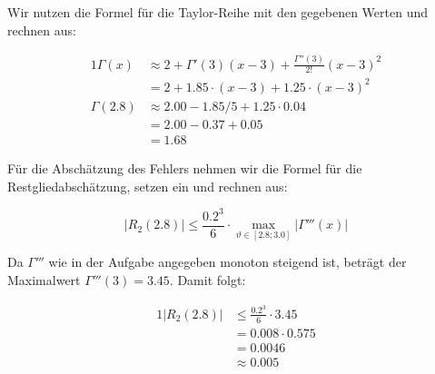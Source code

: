 \item Wir nutzen die Formel für die Taylor-Reihe mit den gegebenen Werten und rechnen aus:

\begin{alignat*}{1}
	\Gamma(x)     & \approx 2 + \Gamma'(3)(x-3) + \frac{\Gamma''(3)}{2!}(x-3)^2 \\
	              & = 2 + 1.85 \cdot (x-3) + 1.25 \cdot (x-3)^2 \\
	\Gamma(2.8)   & \approx 2.00 - 1.85 / 5 + 1.25\cdot {0.04} \\
	              & = 2.00 - 0.37 + 0.05 \\
	              & = 1.68
\end{alignat*}

Für die Abschätzung des Fehlers nehmen wir die Formel für die Restgliedabschätzung, setzen ein und rechnen aus:

$$
	|R_2(2.8)| \le \frac{0.2^3}{6}\cdot\max\limits_{\vartheta \in [2.8;3.0]} |\Gamma'''(x)|
$$

Da $\Gamma'''$ wie in der Aufgabe angegeben monoton steigend ist, beträgt der Maximalwert $\Gamma'''(3)= 3.45$. Damit folgt:

\begin{alignat*}{1}
	|R_2(2.8)| & \le \frac{0.2^3}{6}\cdot 3.45 \\
	           & = 0.008\cdot 0.575 \\
	           & = 0.0046 \\
	           & \approx 0.005
\end{alignat*}


